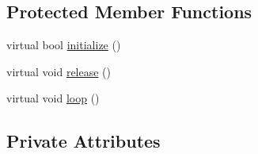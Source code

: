 \subsection*{Protected Member Functions}
\begin{DoxyCompactItemize}
\item 
virtual bool \hyperlink{classWalkingClient_aba6a03fe29a4e947bc6bc0c09a713b2a}{initialize} ()
\item 
virtual void \hyperlink{classWalkingClient_a3b36da9d7649865a13c9318dd73ebc7e}{release} ()
\item 
virtual void \hyperlink{classWalkingClient_afd997bb00534c57fe1b0d5f37f207386}{loop} ()
\end{DoxyCompactItemize}
\subsection*{Private Attributes}

